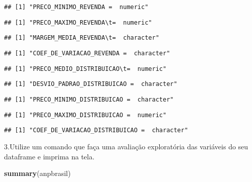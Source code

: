 \documentclass[]{article}
\newenvironment{Shaded}{\begin{snugshade}}{\end{snugshade}}
\newcommand{\KeywordTok}[1]{\textcolor[rgb]{0.13,0.29,0.53}{\textbf{#1}}}
\newcommand{\NormalTok}[1]{#1}
\begin{document}
\begin{verbatim}
## [1] "PRECO_MINIMO_REVENDA =  numeric"
\end{verbatim}

\begin{verbatim}
## [1] "PRECO_MAXIMO_REVENDA\t=  numeric"
\end{verbatim}

\begin{verbatim}
## [1] "MARGEM_MEDIA_REVENDA\t=  character"
\end{verbatim}

\begin{verbatim}
## [1] "COEF_DE_VARIACAO_REVENDA =  character"
\end{verbatim}

\begin{verbatim}
## [1] "PRECO_MEDIO_DISTRIBUICAO\t=  numeric"
\end{verbatim}

\begin{verbatim}
## [1] "DESVIO_PADRAO_DISTRIBUICAO =  character"
\end{verbatim}

\begin{verbatim}
## [1] "PRECO_MINIMO_DISTRIBUICAO =  character"
\end{verbatim}

\begin{verbatim}
## [1] "PRECO_MAXIMO_DISTRIBUICAO =  numeric"
\end{verbatim}

\begin{verbatim}
## [1] "COEF_DE_VARIACAO_DISTRIBUICAO =  character"
\end{verbatim}

3.Utilize um comando que faça uma avaliação exploratória das variáveis
do seu dataframe e imprima na tela.

\begin{Shaded}
\begin{Highlighting}[]
\KeywordTok{summary}\NormalTok{(anpbrasil)}
\end{Highlighting}
\end{Shaded}
\end{document}
